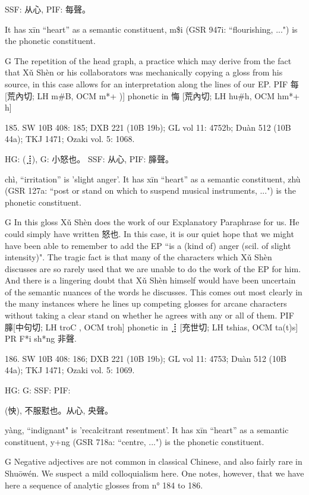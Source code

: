 SSF: 从心,
PIF: 每聲。

It has xīn ``heart'' as a semantic constituent,
m\$i (GSR 947i: ``flourishing, ...") is the phonetic constituent.

G      The repetition of the head graph, a practice which may derive from the fact that Xǔ Shèn or his collaborators was mechanically copying a gloss from his source, in this case allows for an interpretation along the lines of our EP.
PIF   每[荒內切; LH m\#B, OCM m*+ )] phonetic in 悔 [荒內切; LH hu\#h, OCM hm*+ h]

185. SW 10B 408: 185; DXB 221 (10B 19b); GL vol 11: 4752b; Duàn 512 (10B 44a); TKJ 1471; Ozaki vol. 5: 1068.


HG:	(⣸),
G:	小怒也。
SSF: 从心,
PIF: 䐻聲。

chì, ``irritation'' is 'slight anger'.
It has xīn ``heart'' as a semantic constituent,
zhù (GSR 127a: ``post or stand on which to suspend musical instruments, ...") is the phonetic constituent.

G    In this gloss Xǔ Shèn does the work of our Explanatory Paraphrase for us. He could simply have written 怒也. In this case, it is our quiet hope that we might have been able to remember to add the EP ``is a (kind of) anger (scil. of slight intensity)". The tragic fact is that many of the characters which Xǔ Shèn discusses are so rarely used that we are unable to do the work of the EP for him. And there is a lingering doubt that Xǔ Shèn himself would have been uncertain of the semantic nuances of the words he discusses. This comes out most clearly in the many instances where he lines up competing glosses for arcane characters without taking a clear stand on whether he agrees with any or all of them.
PIF     䐻[中句切; LH troC , OCM troh] phonetic in ⣸ [充世切; LH tshias, OCM ta(t)s]
PR	F*i sh*ng 非聲.

186. SW 10B 408: 186; DXB 221 (10B 19b); GL vol 11: 4753; Duàn 512 (10B 44a); TKJ 1471; Ozaki vol. 5: 1069.


HG:
G: SSF: PIF:

  (怏),
不服懟也。从心,
央聲。


yàng, ``indignant"
is 'recalcitrant resentment'.
It has xīn ``heart'' as a semantic constituent,
y+ng (GSR 718a: ``centre, ...") is the phonetic constituent.

G Negative adjectives are not common in classical Chinese, and also fairly rare in Shuōwén. We suspect a mild colloquialism here. One notes, however, that we have here a sequence of analytic glosses from n° 184 to 186.



